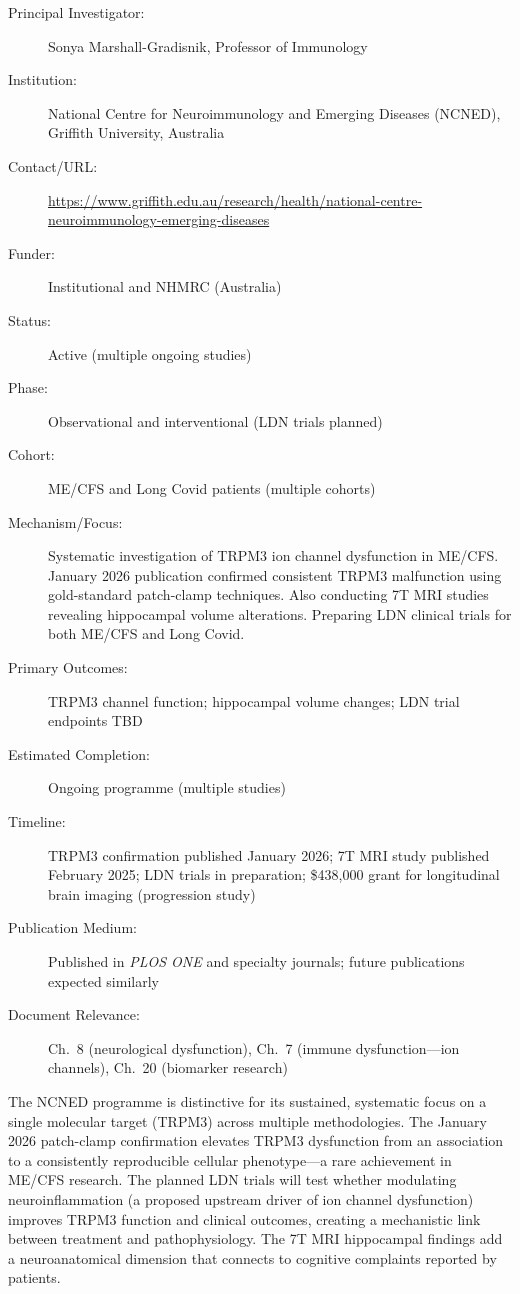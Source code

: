 \begin{description}
    \item[Principal Investigator:] Sonya Marshall-Gradisnik, Professor of
        Immunology
    \item[Institution:] National Centre for Neuroimmunology and Emerging
        Diseases (NCNED), Griffith University, Australia
    \item[Contact/URL:] \url{https://www.griffith.edu.au/research/health/national-centre-neuroimmunology-emerging-diseases}
    \item[Funder:] Institutional and NHMRC (Australia)
    \item[Status:] Active (multiple ongoing studies)
    \item[Phase:] Observational and interventional (LDN trials planned)
    \item[Cohort:] ME/CFS and Long Covid patients (multiple cohorts)
    \item[Mechanism/Focus:] Systematic investigation of TRPM3 ion channel
        dysfunction in ME/CFS.  January 2026 publication confirmed consistent
        TRPM3 malfunction using gold-standard patch-clamp techniques.
        Also conducting 7T MRI studies revealing hippocampal volume
        alterations.  Preparing LDN clinical trials for both ME/CFS
        and Long Covid.
    \item[Primary Outcomes:] TRPM3 channel function; hippocampal volume
        changes; LDN trial endpoints TBD
    \item[Estimated Completion:] Ongoing programme (multiple studies)
    \item[Timeline:] TRPM3 confirmation published January 2026; 7T MRI
        study published February 2025; LDN trials in preparation;
        \$438,000 grant for longitudinal brain imaging (progression study)
    \item[Publication Medium:] Published in \textit{PLOS ONE} and
        specialty journals; future publications expected similarly
    \item[Document Relevance:] Ch.~8 (neurological dysfunction), Ch.~7
        (immune dysfunction---ion channels), Ch.~20 (biomarker research)
\end{description}

The NCNED programme is distinctive for its sustained, systematic focus on a
single molecular target (TRPM3) across multiple methodologies.  The January
2026 patch-clamp confirmation elevates TRPM3 dysfunction from an association
to a consistently reproducible cellular phenotype---a rare achievement in
ME/CFS research.  The planned LDN trials will test whether modulating
neuroinflammation (a proposed upstream driver of ion channel dysfunction)
improves TRPM3 function and clinical outcomes, creating a mechanistic link
between treatment and pathophysiology.  The 7T MRI hippocampal findings add
a neuroanatomical dimension that connects to cognitive complaints reported
by patients.

